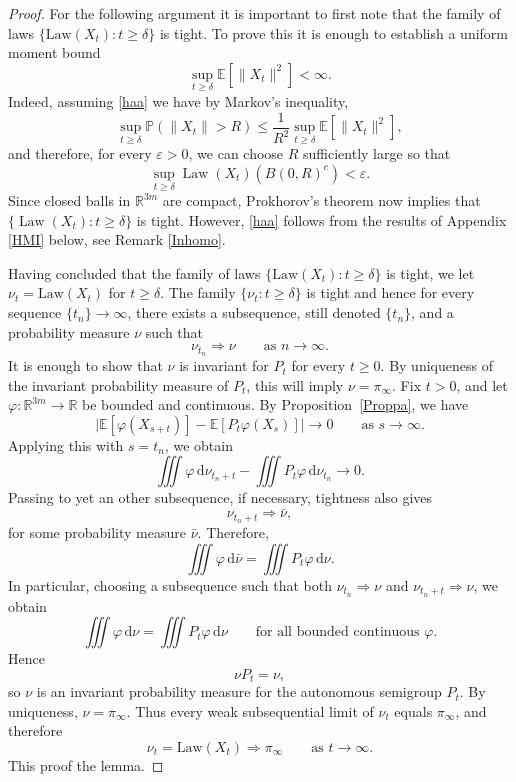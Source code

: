 \documentclass[11pt, a4paper,leqno]{amsart}
\theoremstyle{definition}
\numberwithin{equation}{section}
\begin{document}
\begin{proof} For the following argument it is important to first note that the family of laws \(\{\mathrm{Law}(X_t):t\ge \delta\}\) is tight. To prove this it is enough to establish a uniform moment bound
\begin{equation}\label{haa}
\sup_{t\ge \delta}\mathbb E[\|X_t\|^2]<\infty.
\end{equation}
Indeed, assuming \eqref{haa} we have by Markov's inequality,
\[
\sup_{t\ge \delta}\mathbb P(\|X_t\|>R)
\le \frac{1}{R^2}\sup_{t\ge \delta}\mathbb E[\|X_t\|^2],
\]
and therefore, for every $\varepsilon>0$, we can choose $R$ sufficiently large so that
\[
\sup_{t\ge \delta}\operatorname{Law}(X_t)(B(0,R)^c)<\varepsilon.
\]
Since closed balls in $\mathbb R^{3m}$ are compact, Prokhorov's theorem now implies that
$\{\operatorname{Law}(X_t):t\ge \delta\}$ is tight. However, \eqref{haa} follows from the results of Appendix \ref{HMI} below, see Remark \ref{Inhomo}.

Having concluded that the family of laws \(\{\mathrm{Law}(X_t):t\ge \delta\}\) is tight, we let \(\nu_t=\mathrm{Law}(X_t)\) for \(t\ge \delta\). The family \(\{\nu_t:t\ge \delta\}\) is tight and hence for every sequence \(\{t_n\}\to\infty\), there exists a subsequence, still denoted
\(\{t_n\}\), and a probability measure \(\nu\) such that
\[
\nu_{t_n}\Rightarrow \nu
\qquad\text{as }n\to\infty.
\]
It is enough to show that \(\nu\) is invariant for \(P_t\) for every \(t\ge 0\).
By uniqueness of the invariant probability measure of \(P_t\), this will imply
\(\nu=\pi_\infty\). Fix \(t>0\), and let \(\varphi:\mathbb R^{3m}\to\mathbb R\) be bounded and continuous.
By Proposition~\ref{Proppa}, we have
\begin{equation}\label{eq:asp-semigroup}
\Big|
\mathbb E[\varphi(X_{s+t})]
-
\mathbb E[P_t\varphi(X_s)]
\Big|
\longrightarrow 0
\qquad\text{as }s\to\infty.
\end{equation}
Applying this with \(s=t_n\), we obtain
\[
\iiint \varphi\,\mathrm{d}\nu_{t_n+t}
-
\iiint P_t\varphi\,\mathrm{d}\nu_{t_n}
\longrightarrow 0.
\]
Passing to yet an other subsequence, if necessary, tightness also gives
\[
\nu_{t_n+t}\Rightarrow \bar\nu,
\]
for some probability measure \(\bar\nu\). Therefore,
\[
\iiint \varphi\,\mathrm{d}\bar\nu
=
\iiint P_t\varphi\,\mathrm{d}\nu.
\]
In particular, choosing a subsequence such that both \(\nu_{t_n}\Rightarrow \nu\) and
\(\nu_{t_n+t}\Rightarrow \nu\), we obtain
\[
\iiint \varphi\,\mathrm{d}\nu
=
\iiint P_t\varphi\,\mathrm{d}\nu
\qquad\text{for all bounded continuous }\varphi.
\]
Hence
\[
\nu P_t=\nu,
\]
so \(\nu\) is an invariant probability measure for the autonomous semigroup \(P_t\).
By uniqueness, \(\nu=\pi_\infty\). Thus every weak subsequential limit of \(\nu_t\) equals \(\pi_\infty\), and therefore
\[
\nu_t=\mathrm{Law}(X_t)\Rightarrow \pi_\infty
\qquad\text{as }t\to\infty.
\]
This proof the lemma.
\end{proof}
\end{document}
